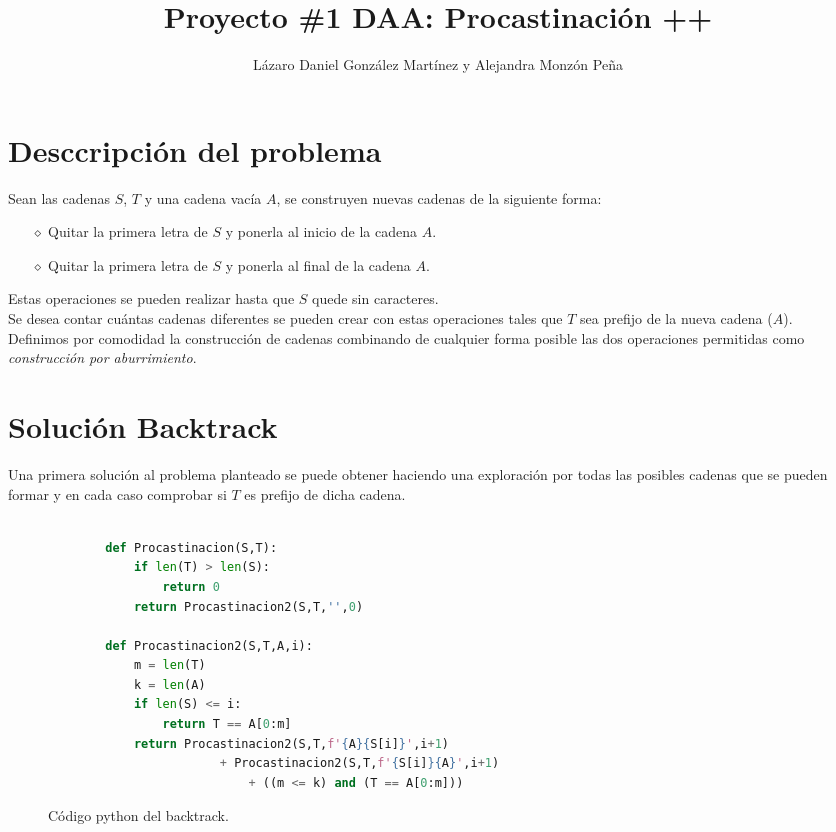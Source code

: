 \documentclass[a4paper]{article}
\begin{document}
    \title{\textbf{Proyecto \#1 DAA:} Procastinaci\'on ++}
    \author{L\'azaro Daniel Gonz\'alez Mart\'inez y Alejandra Monz\'on Pe\~na}
    \date{}
    \maketitle

    \section*{Desccripci\'on del problema}
    Sean las cadenas $S$, $T$ y una cadena vac\'ia $A$, se construyen nuevas cadenas de la siguiente forma: 

    \begin{itemize}
        \item[$\diamond $] Quitar la primera letra de $S$ y ponerla al inicio de la cadena $A$.
        \item[$\diamond $] Quitar la primera letra de $S$ y ponerla al final de la cadena $A$.    
    \end{itemize}

    Estas operaciones se pueden realizar hasta que $S$ quede sin caracteres.\\ 

    Se desea contar cuántas cadenas diferentes se pueden crear con estas operaciones tales que $T$ sea prefijo de 
    la nueva cadena ($A$).\\ 

    Definimos por comodidad la construcci\'on de cadenas combinando de cualquier forma posible las dos operaciones permitidas como 
    \textit{construcci\'on por aburrimiento}.

    \section*{Soluci\'on Backtrack}
    Una primera soluci\'on al problema planteado se puede obtener haciendo una exploraci\'on por todas las posibles cadenas que se pueden formar 
    y en cada caso comprobar si $T$ es prefijo de dicha cadena. 


	\begin{figure}[htb]
	
    \begin{lstlisting}[language=Python]

        def Procastinacion(S,T):
            if len(T) > len(S):
                return 0
            return Procastinacion2(S,T,'',0)
        
        def Procastinacion2(S,T,A,i):
            m = len(T)
            k = len(A)
            if len(S) <= i:
                return T == A[0:m]
            return Procastinacion2(S,T,f'{A}{S[i]}',i+1) 
                        + Procastinacion2(S,T,f'{S[i]}{A}',i+1) 
                            + ((m <= k) and (T == A[0:m]))
	\end{lstlisting}
	\caption{Código python del backtrack.}
	\end{figure}
\end{document}
